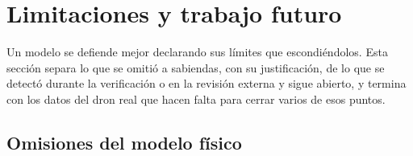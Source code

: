 \section{Limitaciones y trabajo futuro}
\label{sec:limitaciones}

Un modelo se defiende mejor declarando sus límites que escondiéndolos. Esta
sección separa lo que se omitió a sabiendas, con su justificación, de lo que
se detectó durante la verificación o en la revisión externa y sigue
abierto, y termina con los datos del dron real que hacen falta para cerrar
varios de esos puntos.

\subsection{Omisiones del modelo físico}

